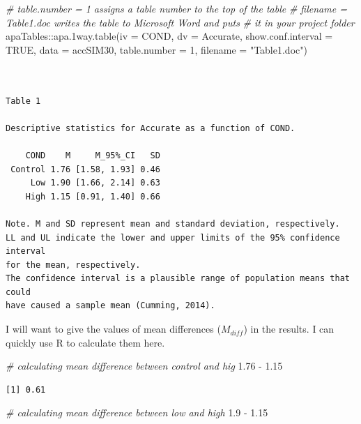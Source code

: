 \documentclass[
  11pt,
]{book}
\newenvironment{Shaded}{\begin{snugshade}}{\end{snugshade}}
\newcommand{\AttributeTok}[1]{\textcolor[rgb]{0.77,0.63,0.00}{#1}}
\newcommand{\CommentTok}[1]{\textcolor[rgb]{0.56,0.35,0.01}{\textit{#1}}}
\newcommand{\ConstantTok}[1]{\textcolor[rgb]{0.00,0.00,0.00}{#1}}
\newcommand{\DecValTok}[1]{\textcolor[rgb]{0.00,0.00,0.81}{#1}}
\newcommand{\FloatTok}[1]{\textcolor[rgb]{0.00,0.00,0.81}{#1}}
\newcommand{\FunctionTok}[1]{\textcolor[rgb]{0.00,0.00,0.00}{#1}}
\newcommand{\NormalTok}[1]{#1}
\newcommand{\SpecialCharTok}[1]{\textcolor[rgb]{0.00,0.00,0.00}{#1}}
\newcommand{\StringTok}[1]{\textcolor[rgb]{0.31,0.60,0.02}{#1}}
\begin{document}
\begin{Shaded}
\begin{Highlighting}[]
\CommentTok{\# table.number = 1 assigns a table number to the top of the table}
\CommentTok{\# filename = \textquotesingle{}Table1.doc\textquotesingle{} writes the table to Microsoft Word and puts}
\CommentTok{\# it in your project folder}
\NormalTok{apaTables}\SpecialCharTok{::}\FunctionTok{apa.1way.table}\NormalTok{(}\AttributeTok{iv =}\NormalTok{ COND, }\AttributeTok{dv =}\NormalTok{ Accurate, }\AttributeTok{show.conf.interval =} \ConstantTok{TRUE}\NormalTok{,}
    \AttributeTok{data =}\NormalTok{ accSIM30, }\AttributeTok{table.number =} \DecValTok{1}\NormalTok{, }\AttributeTok{filename =} \StringTok{"Table1.doc"}\NormalTok{)}
\end{Highlighting}
\end{Shaded}

\begin{verbatim}


Table 1 

Descriptive statistics for Accurate as a function of COND.  

    COND    M     M_95%_CI   SD
 Control 1.76 [1.58, 1.93] 0.46
     Low 1.90 [1.66, 2.14] 0.63
    High 1.15 [0.91, 1.40] 0.66

Note. M and SD represent mean and standard deviation, respectively.
LL and UL indicate the lower and upper limits of the 95% confidence interval 
for the mean, respectively. 
The confidence interval is a plausible range of population means that could 
have caused a sample mean (Cumming, 2014). 
\end{verbatim}

I will want to give the values of mean differences (\(M_{diff}\)) in the results. I can quickly use R to calculate them here.

\begin{Shaded}
\begin{Highlighting}[]
\CommentTok{\# calculating mean difference between control and hig}
\FloatTok{1.76} \SpecialCharTok{{-}} \FloatTok{1.15}
\end{Highlighting}
\end{Shaded}

\begin{verbatim}
[1] 0.61
\end{verbatim}

\begin{Shaded}
\begin{Highlighting}[]
\CommentTok{\# calculating mean difference between low and high}
\FloatTok{1.9} \SpecialCharTok{{-}} \FloatTok{1.15}
\end{Highlighting}
\end{Shaded}
\end{document}
